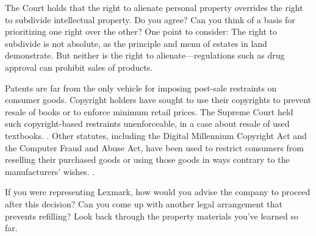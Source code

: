 The Court holds that the right to alienate personal property overrides the right
to
subdivide intellectual property. Do you agree? Can you think of a basis for
prioritizing one
right over the other? One point to consider: The right to subdivide is not
absolute, as the \emph{} principle and menu of estates
in land
demonstrate. But neither is the right to alienate---regulations such as drug
approval can prohibit sales of products.






\item Patents are far from the only vehicle for imposing post-sale restraints on
consumer goods. Copyright holders have sought to use their copyrights to prevent
resale of books or to enforce minimum retail prices. The Supreme Court held such
copyright-based restraints unenforceable, in a case about resale of used
textbooks. . Other statutes, including the Digital
Millennium Copyright Act and the Computer Fraud and Abuse Act, have been used to
restrict consumers from reselling their purchased goods or using those goods in
ways contrary to the manufacturers' wishes. .


\item If you were representing Lexmark, how would you advise the company to
proceed after this decision? Can you come up with another legal arrangement that
prevents refilling? Look back through the property materials you've learned so
far.
